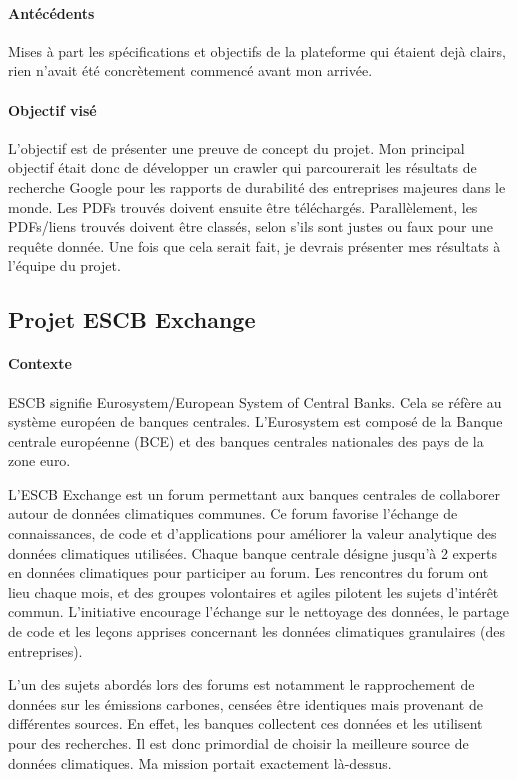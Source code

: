 \paragraph{Antécédents}

Mises à part les spécifications et objectifs de la plateforme qui étaient dejà clairs, rien n'avait été concrètement commencé avant mon arrivée.
\paragraph{Objectif visé}

L'objectif est de présenter une preuve de concept du projet.
Mon principal objectif était donc de développer un crawler qui parcourerait les résultats de recherche Google pour les rapports de durabilité des entreprises majeures dans le monde.
Les PDFs trouvés doivent ensuite être téléchargés. 
Parallèlement, les PDFs/liens trouvés doivent être classés, selon s'ils sont justes ou faux pour une requête donnée.
Une fois que cela serait fait, je devrais présenter mes résultats à l'équipe du projet.

\pagebreak
\subsection{Projet ESCB Exchange}

\paragraph{Contexte}

ESCB signifie Eurosystem/European System of Central Banks. Cela se réfère au système européen de banques centrales. 
L'Eurosystem est composé de la Banque centrale européenne (BCE) et des banques centrales nationales des pays de la zone euro. 

L'ESCB Exchange est un forum permettant aux banques centrales de collaborer autour de données climatiques communes. 
Ce forum favorise l'échange de connaissances, de code et d'applications pour améliorer la valeur analytique des données climatiques utilisées. 
Chaque banque centrale désigne jusqu'à 2 experts en données climatiques pour participer au forum. 
Les rencontres du forum ont lieu chaque mois, et des groupes volontaires et agiles pilotent les sujets d'intérêt commun. 
L'initiative encourage l'échange sur le nettoyage des données, le partage de code et les leçons apprises concernant les données climatiques granulaires (des entreprises).

L'un des sujets abordés lors des forums est notamment le rapprochement de données sur les émissions carbones, censées être identiques mais provenant de différentes sources.
En effet, les banques collectent ces données et les utilisent pour des recherches. Il est donc primordial de choisir la meilleure source de données climatiques.
Ma mission portait exactement là-dessus.

